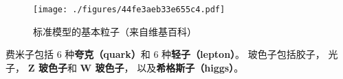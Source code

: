 
\begin{issues}
\issueDraft
\end{issues}

\begin{figure}[ht]
\centering
\texttt{[image: ./figures/44fe3aeb33e655c4.pdf]}
\caption{标准模型的基本粒子（来自维基百科）} \label{fig_BasPar_1}
\end{figure}

费米子包括 6 种\textbf{夸克（quark）}和 6 种\textbf{轻子（lepton）}。 玻色子包括胶子， 光子， \textbf{Z 玻色子}和 \textbf{W 玻色子}， 以及\textbf{希格斯子（higgs）}。

